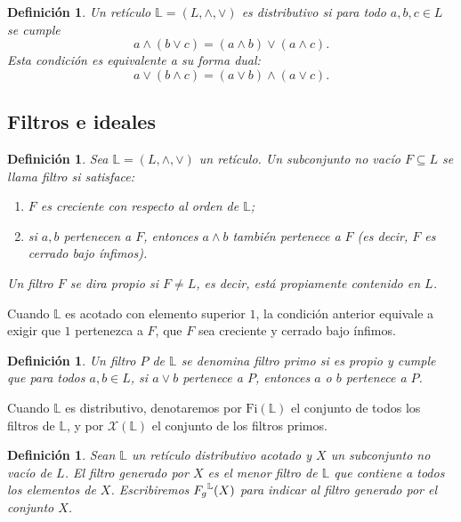 \documentclass[12pt]{book}
\newtheorem{definition}[theorem]{Definición}
\newcommand{\Fg}{\mathnormal{F_g}}
\begin{document}
\begin{definition}\label{def:reticulo_distributivo}
Un retículo \( \mathbb{L}=(L,\wedge,\vee) \) es \emph{distributivo} si para todo \( a,b,c \in L \) se cumple
\[
a \wedge (b \vee c) = (a \wedge b) \vee (a \wedge c).
\]
Esta condición es equivalente a su forma dual:
\[
a \vee (b \wedge c) = (a \vee b) \wedge (a \vee c).
\]
\end{definition}

\subsection{Filtros e ideales}

\begin{definition}\label{def:filtro}
Sea \( \mathbb{L}=(L,\wedge,\vee) \) un retículo.  
Un subconjunto no vacío \( F \subseteq L \) se llama \emph{filtro} si satisface:
\begin{enumerate}[\normalfont (1)]
  \item \( F \) es creciente con respecto al orden de \( \mathbb{L} \);
  \item si \( a,b \) pertenecen a \( F \), entonces \( a\wedge b \) también pertenece a \( F \)
        (es decir, \( F \) es cerrado bajo ínfimos).
\end{enumerate}
Un filtro \( F \) se dira \emph{propio} si $F \neq L$, es decir, está propiamente contenido en \( L \).
\end{definition}

Cuando \( \mathbb{L} \) es acotado con elemento superior \( 1 \),
la condición anterior equivale a exigir que \( 1 \) pertenezca a \( F \),
que \( F \) sea creciente y cerrado bajo ínfimos.

\begin{definition}
Un filtro \( P \) de \( \mathbb{L} \) se denomina \emph{filtro primo}
si es propio y cumple que para todos \( a,b \in L \),
si \( a\vee b \) pertenece a \( P \), entonces \( a \) o \( b \) pertenece a \( P \).
\end{definition}

Cuando \( \mathbb{L} \) es distributivo, denotaremos por \( \mathrm{Fi}(\mathbb{L}) \)
el conjunto de todos los filtros de \( \mathbb{L} \),
y por \( \mathcal{X}(\mathbb{L}) \) el conjunto de los filtros primos.

\begin{definition}
Sean \( \mathbb{L} \) un retículo distributivo acotado 
y \( X \) un subconjunto no vacío de \( L \). El \emph{filtro generado por \( X \)} es el menor filtro de \( \mathbb{L} \)
que contiene a todos los elementos de \( X \). Escribiremos \( \Fg^{\mathbb{L}}(X) \) para indicar al filtro generado por el conjunto $X$.
\end{definition}
\end{document}
